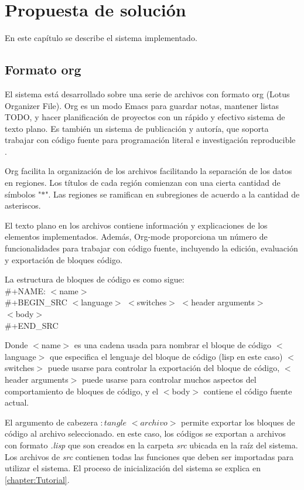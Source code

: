 \chapter{Propuesta de solución}\label{chapter:Solution}

En este capítulo se describe el sistema implementado.

\section{Formato org}\label{3-org}
El sistema está desarrollado sobre una serie de archivos con formato org (Lotus Organizer File). Org es un modo Emacs para guardar notas, mantener listas TODO, y hacer planificación de proyectos con un rápido y efectivo sistema de texto plano. Es también un sistema de publicación y autoría, que soporta trabajar con código fuente para programación literal e investigación reproducible \cite{TODO}.

Org facilita la organización de los archivos facilitando la separación de los datos en regiones. Los títulos de cada región comienzan con una cierta cantidad de símbolos "$\ast$". Las regiones se ramifican en subregiones de acuerdo a la cantidad de asteriscos.

El texto plano en los archivos contiene información y explicaciones de los elementos implementados. Además, Org-mode proporciona un número de funcionalidades para trabajar con código fuente, incluyendo la edición, evaluación y exportación de bloques código.

La estructura de bloques de código es como sigue:\\
\#+NAME: $<$name$>$\\
\#+BEGIN\_SRC $<$language$>$ $<$switches$>$ $<$header arguments$>$\\
$<$body$>$\\
\#+END\_SRC

Donde $<$name$>$ es una cadena usada para nombrar el bloque de código $<$language$>$ que especifica el lenguaje del bloque de código (lisp en este caso) $<$switches$>$ puede usarse para controlar la exportación del bloque de código, $<$header arguments$>$ puede usarse para controlar muchos aspectos del comportamiento de bloques de código, y el $<$body$>$ contiene el código fuente actual.

El argumento de cabezera $:tangle$ $<archivo>$ permite exportar los bloques de código al archivo seleccionado. en este caso, los códigos se exportan a archivos con formato \textit{.lisp} que son creados en la carpeta \textit{src} ubicada en la raíz del sistema. Los archivos de \textit{src} contienen todas las funciones que deben ser importadas para utilizar el sistema. El proceso de inicialización del sistema se explica en \ref{chapter:Tutorial}.

